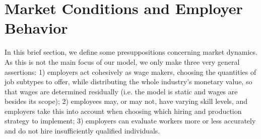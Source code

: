 \documentclass[hidelinks, nonatbib]{elsarticle}
\begin{document}
\section{Market Conditions and Employer Behavior}
In this brief section, we define some presuppositions concerning market dynamics. As this is not the main focus of our model, we only make three very general assertions: 1) employers act cohesively as wage makers, choosing the quantities of job subtypes to offer, while distributing the whole industry's monetary value, so that wages are determined residually (i.e. the model is static and wages are besides its scope); 2) employees may, or may not, have varying skill levels, and employers take this into account when choosing which hiring and production strategy to implement; 3) employers can evaluate workers more or less accurately and do not hire insufficiently qualified individuals.
\end{document}
